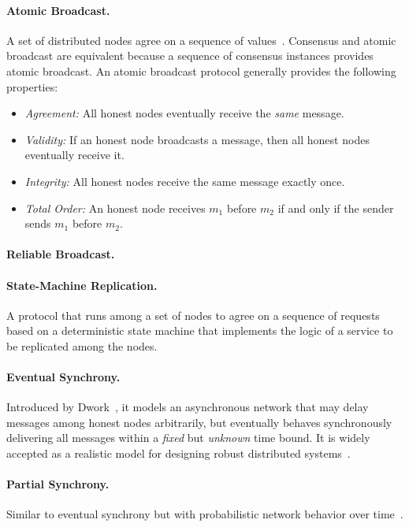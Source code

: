 \documentclass[11pt]{article}
\theoremstyle{mytheoremstyle}
\begin{document}
\paragraph{Atomic Broadcast.}
A set of distributed nodes agree on a sequence of values~\cite{AtomicBroadcast:1993}. Consensus and atomic broadcast are equivalent because a sequence of consensus instances provides atomic broadcast. An atomic broadcast protocol generally provides the following properties:
\begin{itemize}
	\item \textit{Agreement:} All honest nodes eventually receive the \emph{same} message.
	\item \textit{Validity:} If an honest node broadcasts a message, then all honest nodes eventually receive it.
	\item \textit{Integrity:} All honest nodes receive the same message exactly once.
	\item \textit{Total Order:} An honest node receives $m_1$ before $m_2$ if and only if the sender sends $m_1$ before $m_2$.
\end{itemize}

\paragraph{Reliable Broadcast.}

\paragraph{State-Machine Replication.}
A protocol that runs among a set of nodes to agree on a sequence of requests based on a deterministic state machine that implements the logic of a service to be replicated among the nodes.

\paragraph{Eventual Synchrony.} Introduced by Dwork~\cite{Dwork:1988:CPP}, it models an asynchronous network that may delay messages among honest nodes arbitrarily, but eventually behaves synchronously delivering all messages within a \emph{fixed} but \emph{unknown} time bound. It is widely accepted as a realistic model for designing robust distributed systems~\cite{DBLP:journals/corr/CachinV17}.

\paragraph{Partial Synchrony.} Similar to eventual synchrony but with probabilistic network behavior over time~\cite{Dwork:1988:CPP}.
\end{document}
